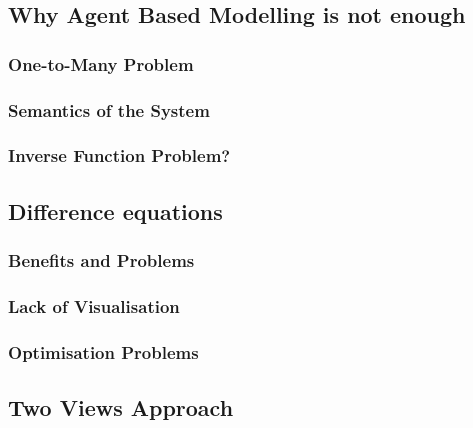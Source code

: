 \documentclass{article}
\begin{document}
\subsection{Why Agent Based Modelling is not enough}

\subsubsection{One-to-Many Problem}
\subsubsection{Semantics of the System} 
\subsubsection{Inverse Function Problem?} 

\subsection{Difference equations} 

 \subsubsection{Benefits and Problems} 
 
 \subsubsection{Lack of Visualisation} 

\subsubsection{Optimisation Problems} 

\subsection{Two Views Approach} 
\end{document}
